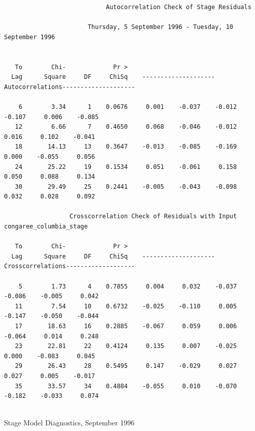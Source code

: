 \documentclass[12pt]{report}
\begin{document}
\begin{table} \scriptsize
\begin{centering}
\begin{verbatim}
                            Autocorrelation Check of Stage Residuals

                       Thursday, 5 September 1996 - Tuesday, 10 September 1996


   To        Chi-             Pr >
  Lag      Square     DF     ChiSq    --------------------Autocorrelations--------------------

    6        3.34      1    0.0676     0.001    -0.037    -0.012    -0.107     0.006    -0.085
   12        6.66      7    0.4650     0.068    -0.046    -0.012     0.016     0.102    -0.041
   18       14.13     13    0.3647    -0.013    -0.085    -0.169     0.000    -0.055     0.056
   24       25.22     19    0.1534     0.051    -0.061     0.158     0.050     0.088     0.134
   30       29.49     25    0.2441    -0.005    -0.043    -0.098     0.032     0.028     0.092

                  Crosscorrelation Check of Residuals with Input congaree_columbia_stage

   To        Chi-             Pr >
  Lag      Square     DF     ChiSq    --------------------Crosscorrelations-------------------

    5        1.73      4    0.7855     0.004     0.032    -0.037    -0.086    -0.005     0.042
   11        7.54     10    0.6732    -0.025    -0.110     0.005    -0.147    -0.050    -0.044
   17       18.63     16    0.2885    -0.067     0.059     0.006    -0.064     0.014     0.248
   23       22.81     22    0.4124     0.135     0.007    -0.025     0.000    -0.083     0.045
   29       26.43     28    0.5495     0.147    -0.029     0.027     0.027     0.005    -0.017
   35       33.57     34    0.4884    -0.055     0.010    -0.070    -0.182    -0.033     0.074


\end{verbatim}
\end{centering}\normalsize\caption{Stage Model Diagnostics, September 1996}\label{fig:sepstagemdldiag}
\end{table}
\end{document}
